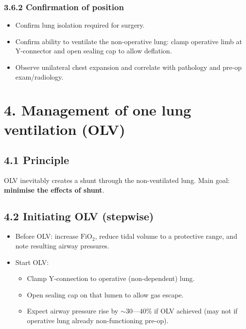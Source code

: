 \documentclass[11pt,a4paper]{article}
\begin{document}
\subsubsection{3.6.2 Confirmation of position}
\begin{itemize}[leftmargin=*, itemsep=2pt]
  \item Confirm lung isolation required for surgery.
  \item Confirm ability to ventilate the non-operative lung: clamp operative limb at Y-connector and open sealing cap to allow deflation.
  \item Observe unilateral chest expansion and correlate with pathology and pre-op exam/radiology.
\end{itemize}

\section{4. Management of one lung ventilation (OLV)}

\subsection{4.1 Principle}
OLV inevitably creates a shunt through the non-ventilated lung. Main goal: \textbf{minimise the effects of shunt}.

\subsection{4.2 Initiating OLV (stepwise)}
\begin{itemize}[leftmargin=*, itemsep=2pt]
  \item Before OLV: increase \(\mathrm{FiO_2}\), reduce tidal volume to a protective range, and note resulting airway pressures.
  \item Start OLV:
  \begin{itemize}[leftmargin=*, itemsep=2pt]
    \item Clamp Y-connection to operative (non-dependent) lung.
    \item Open sealing cap on that lumen to allow gas escape.
    \item Expect airway pressure rise by \(\sim 30\)---\(40\%\) if OLV achieved (may not if operative lung already non-functioning pre-op).
  \end{itemize}
\end{itemize}
\end{document}
